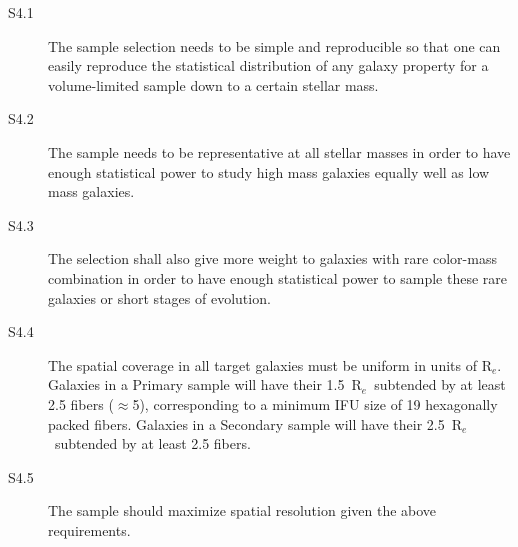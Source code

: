 \documentclass[preprint,11pt]{aastex}
\newcommand{\Msun}{{\rm M}_{\odot}}
\newcommand{\Reff}{{R$_{e}$}}
\begin{document}


\begin{description}
\item [S4.1] The sample selection needs to be simple and reproducible so that one can 
easily reproduce the statistical distribution of any galaxy property for a volume-limited
sample down to a certain stellar mass. 
\item [S4.2] The sample needs to be representative at all stellar
  masses in order to have enough statistical power to study high mass
  galaxies equally well as low mass galaxies.
\item [S4.3] The selection shall also give more weight to galaxies with rare color-mass combination in order to have enough statistical power to sample these rare galaxies or short stages of evolution. 
\item [S4.4] The spatial coverage in all target galaxies must be
  uniform in units of \Reff. Galaxies in a Primary sample will have
  their 1.5~\Reff\ subtended by at least 2.5 fibers
  ($\approx$5\arcsec), corresponding to a minimum IFU size of 19
  hexagonally packed fibers. Galaxies in a Secondary sample will have
  their 2.5~\Reff\ subtended by at least 2.5 fibers.
\item [S4.5] The sample should maximize spatial resolution given the above requirements.

\end{description}
\end{document}
